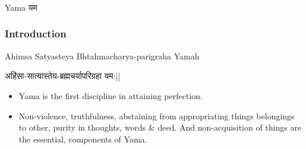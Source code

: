 \begin{frame}[fragile]\frametitle{}
\begin{center}
{\Large Yama यम}
\end{center}
\end{frame}

\begin{frame}[fragile]\frametitle{Introduction}

Ahimsa Satyasteya Bhtahmacharya-parigraha Yamah

अहिंसा-सात्यास्तेय-ब्रह्मचर्यापरिग्रहा यम:||

	\begin{itemize}
	\item Yama  is 
the  first  discipline  in  attaining 
perfection.
	\item Non-violence,  truthfulness, abstaining  from  appropriating things  belongings  to  other, 
purity  in  thoughts,  words  \& 
deed.  And  non-acquisition  of 
things  are  the  essential, 
components of Yama. 
	\end{itemize}

\end{frame}

